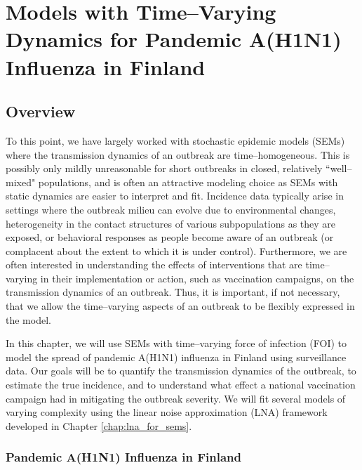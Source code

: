 \chapter{Models with Time--Varying Dynamics for Pandemic A(H1N1) Influenza in Finland}
\label{chap:lna_extensions}

\section{Overview}
\label{sec:lna_extensions_overview}
To this point, we have largely worked with stochastic epidemic models (SEMs) where the transmission dynamics of an outbreak are time--homogeneous. This is possibly only mildly unreasonable for short outbreaks in closed, relatively ``well--mixed" populations, and is often an attractive modeling choice as SEMs with static dynamics are easier to interpret and fit. Incidence data typically arise in settings where the outbreak milieu can evolve due to environmental changes, heterogeneity in the contact structures of various subpopulations as they are exposed, or behavioral responses as people become aware of an outbreak (or complacent about the extent to which it is under control). Furthermore, we are often interested in understanding the effects of interventions that are time--varying in their implementation or action, such as vaccination campaigns, on the transmission dynamics of an outbreak. Thus, it is important, if not necessary, that we allow the time--varying aspects of an outbreak to be flexibly expressed in the model.

In this chapter, we will use SEMs with time--varying force of infection (FOI) to model the spread of pandemic A(H1N1) influenza in Finland using surveillance data. Our goals will be to quantify the transmission dynamics of the outbreak, to estimate the true incidence, and to understand what effect a national vaccination campaign had in mitigating the outbreak severity. We will fit several models of varying complexity using the linear noise approximation (LNA) framework developed in Chapter \ref{chap:lna_for_sems}.

\subsection{Pandemic A(H1N1) Influenza in Finland}
\label{subsec:flu_description}

